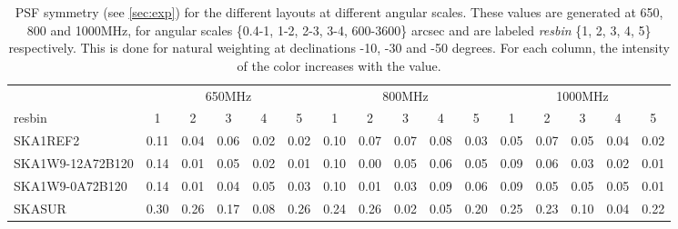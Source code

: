\begin{table}[!htp]
{{\begin{tabular}{|lccccc||ccccc||ccccc|}
 \tabularnewline \cline{2-16} \multicolumn{1}{c}{ } & \multicolumn{5}{|c}{650MHz}  & \multicolumn{5}{c}{800MHz}  & \multicolumn{5}{c|}{1000MHz} \tabularnewline \cline{1-16} 
 resbin  &1 & 2 & 3 & 4 & 5 & 1 & 2 & 3 & 4 & 5 & 1 & 2 & 3 & 4 & 5 \tabularnewline \hline
SKA1REF2 & 0.11 \cellcolor{blue!18.00} & 0.04 \cellcolor{red!23.04} & 0.06 \cellcolor{green!24.46} & 0.02 \cellcolor{orange!18.00} & 0.02 \cellcolor{purple!19.68} & 0.10 \cellcolor{blue!18.00} & 0.07 \cellcolor{red!29.31} & 0.07 \cellcolor{green!60.00} & 0.08 \cellcolor{orange!49.50} & 0.03 \cellcolor{purple!18.00} & 0.05 \cellcolor{blue!18.00} & 0.07 \cellcolor{red!22.67} & 0.05 \cellcolor{green!30.00} & 0.04 \cellcolor{orange!46.00} & 0.02 \cellcolor{purple!20.00}\\ \hline 
SKA1W9-12A72B120 & 0.14 \cellcolor{blue!24.63} & 0.01 \cellcolor{red!18.00} & 0.05 \cellcolor{green!21.23} & 0.02 \cellcolor{orange!18.00} & 0.01 \cellcolor{purple!18.00} & 0.10 \cellcolor{blue!18.00} & 0.00 \cellcolor{red!18.00} & 0.05 \cellcolor{green!43.20} & 0.06 \cellcolor{orange!28.50} & 0.05 \cellcolor{purple!22.94} & 0.09 \cellcolor{blue!26.40} & 0.06 \cellcolor{red!20.33} & 0.03 \cellcolor{green!18.00} & 0.02 \cellcolor{orange!18.00} & 0.01 \cellcolor{purple!18.00}\\ \hline 
SKA1W9-0A72B120 & 0.14 \cellcolor{blue!24.63} & 0.01 \cellcolor{red!18.00} & 0.04 \cellcolor{green!18.00} & 0.05 \cellcolor{orange!39.00} & 0.03 \cellcolor{purple!21.36} & 0.10 \cellcolor{blue!18.00} & 0.01 \cellcolor{red!19.62} & 0.03 \cellcolor{green!26.40} & 0.09 \cellcolor{orange!60.00} & 0.06 \cellcolor{purple!25.41} & 0.09 \cellcolor{blue!26.40} & 0.05 \cellcolor{red!18.00} & 0.05 \cellcolor{green!30.00} & 0.05 \cellcolor{orange!60.00} & 0.01 \cellcolor{purple!18.00}\\ \hline 
SKASUR & 0.30 \cellcolor{blue!60.00} & 0.26 \cellcolor{red!60.00} & 0.17 \cellcolor{green!60.00} & 0.08 \cellcolor{orange!60.00} & 0.26 \cellcolor{purple!60.00} & 0.24 \cellcolor{blue!60.00} & 0.26 \cellcolor{red!60.00} & 0.02 \cellcolor{green!18.00} & 0.05 \cellcolor{orange!18.00} & 0.20 \cellcolor{purple!60.00} & 0.25 \cellcolor{blue!60.00} & 0.23 \cellcolor{red!60.00} & 0.10 \cellcolor{green!60.00} & 0.04 \cellcolor{orange!46.00} & 0.22 \cellcolor{purple!60.00}\tabularnewline \hline 
\end{tabular}}\hfil 

\caption{PSF symmetry (see \autoref{sec:exp})  for the different layouts at different angular scales. These values are generated at 650, 800 and 1000MHz, for angular scales \{0.4-1, 1-2, 2-3, 3-4, 600-3600\} arcsec and are labeled {\it resbin} \{1, 2, 3, 4, 5\} respectively. This is done for natural weighting at declinations -10, -30 and -50 degrees. For each column, the intensity of the color increases with the value.}\label{tab:psf_sym-band1}}
 \end{table}